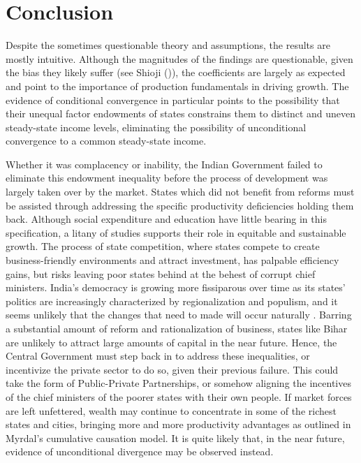 \documentclass[a4paper, 11pt]{article}
\begin{document}
\section{Conclusion}
Despite the sometimes questionable theory and assumptions, the results are mostly intuitive.  Although the magnitudes of the findings are questionable, given the bias they likely suffer (see Shioji (\citeyear{shioji1997convergence})), the coefficients are largely as expected and point to the importance of production fundamentals in driving growth.  The evidence of conditional convergence in particular points to the possibility that their unequal factor endowments of states constrains them to distinct and uneven steady-state income levels, eliminating the possibility of unconditional convergence to a common steady-state income.  \par   
Whether it was complacency or inability, the Indian Government failed to eliminate this endowment inequality before the process of development was largely taken over by the market.  States which did not benefit from reforms must be assisted through addressing the specific productivity deficiencies holding them back.  Although social expenditure and education have little bearing in this specification, a litany of studies supports their role in equitable and sustainable growth.  The process of state competition, where states compete to create business-friendly environments and attract investment, has palpable efficiency gains, but risks leaving poor states behind at the behest of corrupt chief ministers.  India's democracy is growing more fissiparous over time as its states' politics are increasingly characterized by regionalization and populism, and it seems unlikely that the changes that need to made will occur naturally \citep{ahluwalia_state-level_2000}.  Barring a substantial amount of reform and rationalization of business, states like Bihar are unlikely to attract large amounts of capital in the near future.  Hence, the Central Government must step back in to address these inequalities, or incentivize the private sector to do so, given their previous failure.  This could take the form of Public-Private Partnerships, or somehow aligning the incentives of the chief ministers of the poorer states with their own people.  If market forces are left unfettered, wealth may continue to concentrate in some of the richest states and cities, bringing more and more productivity advantages as outlined in Myrdal's cumulative causation model.  It is quite likely that, in the near future, evidence of unconditional divergence may be observed instead.
\end{document}

